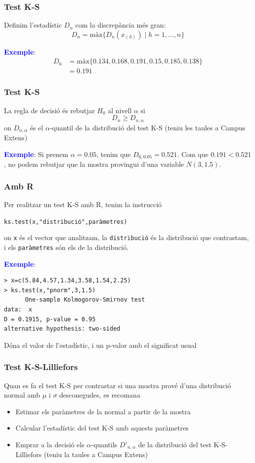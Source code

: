 \documentclass[12pt,t]{beamer}
\newcommand{\blue}[1]{\textcolor{blue}{#1}}
\renewcommand{\emph}[1]{{\color{red}#1}}
\renewcommand{\geq}{\geqslant}
\theoremstyle{plain}
\theoremstyle{definition}
\begin{document}
\begin{frame}
\frametitle{Test K-S}
Definim l'estadístic \emph{$D_n$} com la discrepància més gran:
$$
D_n=\mbox{màx}\big\{D_n(x_{(h)})\mid h=1,\ldots, n\big\}
$$

\blue{\bf Exemple}: 
$$
\begin{array}{rl}
D_6& =\mbox{màx}\{0.134,0.168,0.191,0.15,0.185,0.138\}\\ &=0.191
\end{array}
$$

\end{frame}

\begin{frame}
\frametitle{Test K-S}

La \emph{regla de decisió} és rebutjar $H_0$ al nivell $\alpha$ si
$$
D_n\geq D_{n,\alpha}
$$
on $D_{n,\alpha}$ és el $\alpha$-quantil de la distribució del test K-S (teniu les taules a Campus Extens)
\medskip


\blue{\bf Exemple}: Si prenem $\alpha=0.05$, tenim que $D_{6,0.05}=0.521$.
Com que $0.191<0.521$, no podem rebutjar que la mostra provingui d'una variable  $N(3,1.5)$.

\end{frame}

\begin{frame}[fragile]
\frametitle{Amb R}
\vspace*{-1ex}

Per realitzar un test K-S amb R, tenim la instrucció
\begin{center}
\texttt{ks.test(x,"distribució",paràmetres)}
\end{center} 
on \texttt{x} és el vector que analitzam, la \texttt{distribució} és la distribució que contrastam, i els \texttt{paràmetres} són els de la distribució.
\medskip


\blue{\bf Exemple}: 
\begin{verbatim}
> x=c(5.84,4.57,1.34,3.58,1.54,2.25)
> ks.test(x,"pnorm",3,1.5)
      One-sample Kolmogorov-Smirnov test
data:  x 
D = 0.1915, p-value = 0.95
alternative hypothesis: two-sided
\end{verbatim}
Dóna el valor de l'estadístic, i un p-valor amb el significat usual


\end{frame}

\begin{frame}
\frametitle{Test K-S-Lilliefors}

Quan es fa el test K-S per contrastar si una mostra prové d'una distribució \emph{normal amb $\mu$ i $\sigma$ desconegudes}, es recomana
\begin{itemize}
\item Estimar els paràmetres de la normal a partir de la mostra
\medskip

\item Calcular l'estadístic del test K-S amb aquests paràmetres
\medskip

\item Emprar  a la decisió els $\alpha$-quantils $D'_{n,\alpha}$ de la distribució del \emph{test K-S-Lilliefors} (teniu la taules a Campus Extens)
\end{itemize}

\end{frame}
\end{document}
